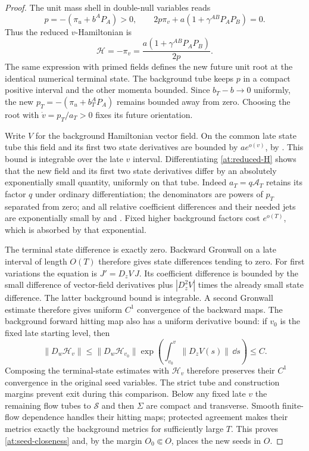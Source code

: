 \begin{proof}
The unit mass shell in double-null variables reads
\[
 p=-(\pi_u+b^AP_A)>0,\qquad
 2p\pi_v+a(1+\gamma^{AB}P_AP_B)=0.
\]
Thus the reduced $v$-Hamiltonian is
\begin{equation}\label{at:reduced-H}
 \mathcal H=-\pi_v=
        \frac{a(1+\gamma^{AB}P_AP_B)}{2p}.
\end{equation}
The same expression with primed fields defines the new future
unit root at the identical numerical terminal state. The
background tube keeps $p$ in a compact positive interval and
the other momenta bounded. Since $b_T-b\to0$ uniformly, the
new $p_T=-(\pi_u+b_T^AP_A)$ remains bounded away from zero.
Choosing the root with $\dot v=p_T/a_T>0$ fixes its future
orientation.

Write $V$ for the background Hamiltonian vector field. On the common
late state tube this field and its first two state derivatives are bounded by
$a e^{o(v)}$, by . This bound is
integrable over the late $v$ interval. Differentiating
\eqref{at:reduced-H} shows that the new field and its first
two state derivatives differ by an absolutely exponentially
small quantity, uniformly on that tube. Indeed $a_T=q\mathcal A_T$
retains its factor $q$ under ordinary differentiation;
the denominators are powers of $p_T$ separated from zero;
and all relative coefficient differences and their needed
jets are exponentially small by 
and . Fixed higher background factors
cost $e^{o(T)}$, which is absorbed by that exponential.

The terminal state difference is exactly zero. Backward Gronwall
on a late interval of length $O(T)$ therefore gives state
differences tending to zero. For first variations the equation
is $J'=D_zV\,J$. Its coefficient difference is bounded by the
small difference of vector-field derivatives plus
$|D_z^2V|$ times the already small state difference. The latter
background bound is integrable. A second Gronwall estimate
therefore gives uniform $C^1$ convergence of the backward maps.
The background forward hitting map also has a uniform derivative bound:
if $v_0$ is the fixed late starting level, then
\[
 \|D_w\mathcal H_v\|
 \le \|D_w\mathcal H_{v_0}\|
       \exp\!\left(\int_{v_0}^{v}\|D_zV(s)\|\,\dd s\right)\le C.
\]
Composing the terminal-state estimates with $\mathcal H_v$ therefore
preserves their $C^1$ convergence in the original seed variables.
The strict tube and construction margins prevent exit during
this comparison. Below any fixed late $v$ the remaining flow
tubes to $\mathcal S$ and then $\Sigma$ are compact and
transverse. Smooth finite-flow dependence handles their hitting
maps; protected agreement makes their metrics exactly the
background metrics for sufficiently large $T$. This proves
\eqref{at:seed-closeness} and, by the margin $O_0\Subset O$,
places the new seeds in $O$.


\end{proof}
